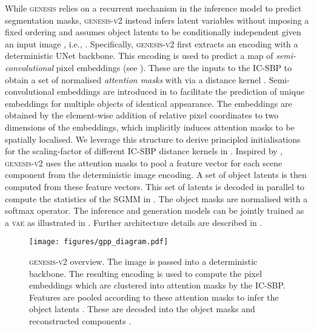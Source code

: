 \documentclass{article}
\begin{document}
While \textsc{genesis} relies on a recurrent mechanism in the inference model to predict segmentation masks, \textsc{genesis-v2} instead infers latent variables without imposing a fixed ordering and assumes object latents  to be conditionally independent given an input image , i.e., .
Specifically, \textsc{genesis-v2} first extracts an encoding with a deterministic UNet backbone.
This encoding is used to predict a map of \emph{semi-convolutional} pixel embeddings  (see \cite{novotny2018semi}).
These are the inputs to the IC-SBP to obtain a set of normalised \emph{attention masks}  with  via a distance kernel .
Semi-convolutional embeddings are introduced in \citet{novotny2018semi} to facilitate the prediction of unique embeddings for multiple objects of identical appearance.
The embeddings are obtained by the element-wise addition of relative pixel coordinates to two dimensions of the embeddings, which implicitly induces attention masks to be spatially localised.
We leverage this structure to derive principled initialisations for the scaling-factor of different \mbox{IC-SBP} distance kernels  in .
Inspired by \citet{locatello2020object}, \textsc{genesis-v2} uses the attention masks  to pool a feature vector for each scene component from the deterministic image encoding.
A set of object latents  is then computed from these feature vectors.
This set of latents is decoded in parallel to compute the statistics of the SGMM in .
The object masks  are normalised with a softmax operator.
The inference and generation models can be jointly trained as a \textsc{vae} as illustrated in .
Further architecture details are described in .

\begin{figure}
	\centering
	\texttt{[image: figures/gpp\_diagram.pdf]}
	\caption{\textsc{genesis-v2} overview. The image  is passed into a deterministic backbone. The resulting encoding is used to compute the pixel embeddings  which are clustered into attention masks  by the IC-SBP. Features are pooled according to these attention masks to infer the object latents . These are decoded into the object masks  and reconstructed components .}
	\label{fig:gpp:model_diagram}
\end{figure}
\end{document}
